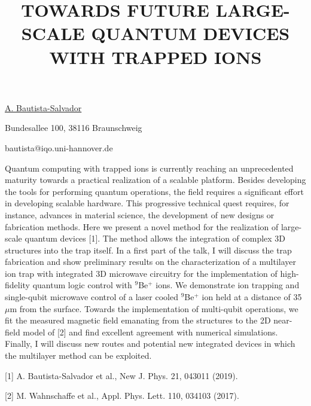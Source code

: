 \title{TOWARDS FUTURE LARGE-SCALE QUANTUM DEVICES WITH TRAPPED IONS}

\underline{A. Bautista-Salvador}  

{\normalsize{\vspace{-4mm}
Bundesallee 100, 38116 Braunschweig



\email bautista@iqo.uni-hannover.de}}

Quantum computing with trapped ions is currently reaching an unprecedented maturity towards a practical realization of a scalable platform. Besides developing the tools for performing quantum operations, the field requires a significant effort in developing scalable hardware. This progressive technical quest requires, for instance, advances in material science, the development of new designs or fabrication methods. Here we present a novel method for the realization of large-scale quantum devices [1]. The method allows the integration of complex 3D structures into the trap itself. In a first part of the talk, I will discuss the trap fabrication and show preliminary results on the characterization of a multilayer ion trap with integrated 3D microwave circuitry for the implementation of high-fidelity quantum logic control with $^9$Be$^+$ ions. We demonstrate ion trapping and single-qubit microwave control of a laser cooled $^9$Be$^+$ ion held at a distance of 35 $\mu$m from the surface. Towards the implementation of multi-qubit operations, we fit the measured magnetic field emanating from the structures to the 2D near-field model of [2] and find excellent agreement with numerical simulations. Finally, I will discuss new routes and potential new integrated devices in which the multilayer method can be exploited.

{\normalsize
[1] A. Bautista-Salvador et al., New J. Phys. 21, 043011 (2019).
\vsp

[2] M. Wahnschaffe et al., Appl. Phys. Lett. 110, 034103 (2017).
}

\vspace{\baselineskip}